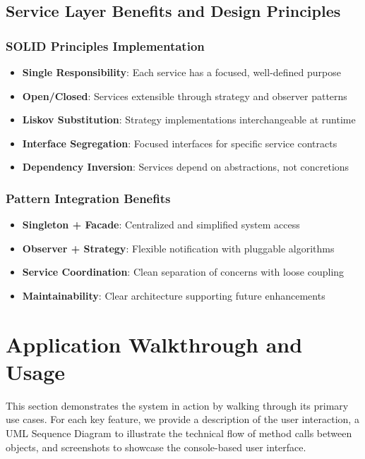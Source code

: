 \subsection{Service Layer Benefits and Design Principles}

\subsubsection{SOLID Principles Implementation}
\begin{itemize}
	\item \textbf{Single Responsibility}: Each service has a focused, well-defined purpose
	\item \textbf{Open/Closed}: Services extensible through strategy and observer patterns
	\item \textbf{Liskov Substitution}: Strategy implementations interchangeable at runtime
	\item \textbf{Interface Segregation}: Focused interfaces for specific service contracts
	\item \textbf{Dependency Inversion}: Services depend on abstractions, not concretions
\end{itemize}

\subsubsection{Pattern Integration Benefits}
\begin{itemize}
	\item \textbf{Singleton + Facade}: Centralized and simplified system access
	\item \textbf{Observer + Strategy}: Flexible notification with pluggable algorithms
	\item \textbf{Service Coordination}: Clean separation of concerns with loose coupling
	\item \textbf{Maintainability}: Clear architecture supporting future enhancements
\end{itemize}


\section{Application Walkthrough and Usage}
\label{sec:walkthrough}

This section demonstrates the system in action by walking through its primary use cases. For each key feature, we provide a description of the user interaction, a UML Sequence Diagram to illustrate the technical flow of method calls between objects, and screenshots to showcase the console-based user interface.
